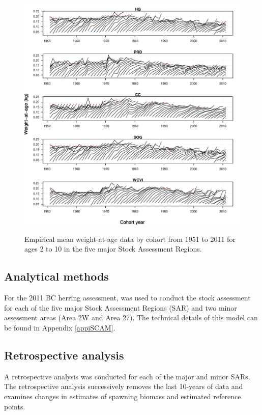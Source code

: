 \begin{figure}[!tbp]
	\centering
	\includegraphics[width=\textwidth]{../Figs/iscam_fig_MeanWt.pdf}\\
	\caption{Empirical mean weight-at-age data by cohort from 1951 to 2011 for ages 2 to 10 in the five major Stock Assessment Regions.}\label{FigMeanWt}
\end{figure}
	

	\subsection{Analytical methods}

	For the 2011 BC herring assessment, \iscam was used to conduct the stock assessment for each of the five major Stock Assessment Regions (SAR) and two minor assessment areas (Area 2W and Area 27).  The technical details of this model can be found in Appendix \ref{appiSCAM}.
		
	\subsection{Retrospective analysis}
	A retrospective analysis was conducted for each of the major and minor SARs.  The retrospective analysis successively removes the last 10-years of data and examines changes in estimates of spawning biomass and estimated reference points.  
	
